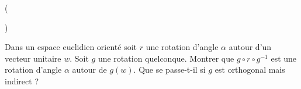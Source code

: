 \begin{tiny}()\end{tiny} Dans un espace euclidien orienté soit $r$ une rotation d'angle $\alpha$ autour d'un vecteur unitaire $w$. Soit $g$ une rotation quelconque. Montrer que $g\circ r \circ g^{-1}$ est une rotation d'angle $\alpha$ autour de $g(w)$. Que se passe-t-il si $g$ est orthogonal mais indirect ?